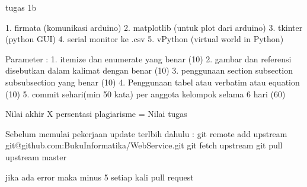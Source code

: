 tugas 1b

1. firmata (komunikasi arduino)
2. matplotlib (untuk plot dari arduino)
3. tkinter (python GUI)
4. serial monitor ke .csv
5. vPython (virtual world in Python)

Parameter :
1. itemize dan enumerate yang benar (10)
2. gambar dan referensi disebutkan dalam kalimat dengan benar (10)
3. penggunaan section subsection subsubsection yang benar (10)
4. Penggunaan tabel atau verbatim atau equation (10)
5. commit sehari(min 50 kata) per anggota kelompok selama 6 hari (60)

Nilai akhir X persentasi plagiarisme = Nilai tugas

Sebelum memulai pekerjaan update terlbih dahulu :
git remote add upstream git@github.com:BukuInformatika/WebService.git
git fetch upstream
git pull upstream master

jika ada error maka minus 5 setiap kali pull request
